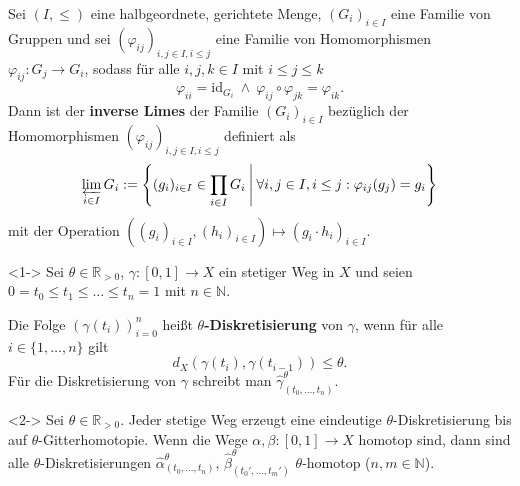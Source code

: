 \documentclass[12pt, aspectratio=169]{beamer}
\newcommand{\R}[0]{\mathbb{R}}
\newcommand{\N}[0]{\mathbb{N}}
\begin{document}
\begin{frame}
    \begin{definition}
        Sei $(I, \leq)$ eine halbgeordnete, gerichtete Menge, 
        $(G_i)_{i\in I}$ eine Familie von Gruppen und sei $(\varphi_{ij})_{i,j \in I, i \leq j}$ eine Familie von Homomorphismen 
        $\varphi_{ij}\colon G_j \to G_i$, sodass für alle $i,j,k \in I$ mit $i \leq j \leq k$
        \begin{equation*}
            \varphi_{ii} = \text{id}_{G_i} \: \land \: \varphi_{ij} \circ \varphi_{jk} = \varphi_{ik}.
        \end{equation*}
        Dann ist der \textbf{inverse Limes} der Familie $(G_i)_{i\in I}$ bezüglich der Homomorphismen $(\varphi_{ij})_{i,j \in I, i \leq j}$ definiert als
        \begin{equation*}
            \varprojlim_{i\in I} G_i := \left\{(g_i)_{i\in I} \in \prod_{i\in I} G_i \: \middle| \: \forall i,j \in I, i \leq j: \varphi_{ij}(g_j) = g_i\right\}
        \end{equation*}
        mit der Operation $((g_i)_{i\in I}, (h_i)_{i\in I}) \mapsto (g_i \cdot h_i)_{i\in I}$.
    \end{definition}
\end{frame}

\begin{frame}
    \begin{definition}<1->
        Sei $\theta \in \R_{>0}$, $\gamma\colon [0,1] \to X$ ein stetiger Weg in $X$ und seien $0 = t_0 \leq t_1 \leq \ldots \leq t_n = 1$ mit $n \in \N$.
        
        Die Folge $(\gamma(t_i))_{i=0}^n$ heißt \textbf{$\theta$-Diskretisierung} von $\gamma$, wenn für alle $i \in \{1, \ldots, n\}$ gilt
        \begin{equation*}
            d_X(\gamma(t_{i}), \gamma(t_{i-1})) \leq \theta.
        \end{equation*}
        Für die Diskretisierung von $\gamma$ schreibt man $\widehat{\gamma}^{\theta}_{(t_0, \ldots, t_n)}$.
    \end{definition}

    \begin{lemma}<2->\label{lem:discretization}
        Sei $\theta \in \R_{>0}$. Jeder stetige Weg erzeugt eine eindeutige $\theta$-Diskretisierung bis auf $\theta$-Gitterhomotopie. 
        Wenn die Wege $\alpha, \beta\colon [0,1] \to X$ homotop sind, dann sind alle $\theta$-Diskretisierungen 
        $\widehat{\alpha}^{\theta}_{(t_0, \ldots, t_n)}$, $\widehat{\beta}^{\theta}_{(t_0', \ldots, t_m')}$ $\theta$-homotop ($n,m \in \N$).
    \end{lemma}
\end{frame}
\end{document}
